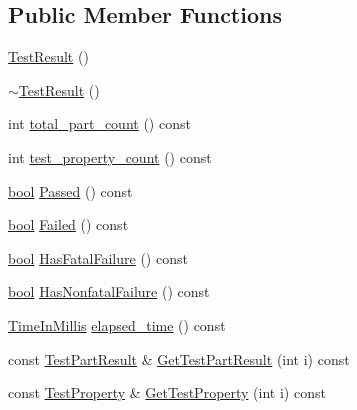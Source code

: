 \subsection*{Public Member Functions}
\begin{DoxyCompactItemize}
\item 
\hyperlink{classtesting_1_1TestResult_a5cf5dd6f416b7334ea601aab21a2fda5}{Test\+Result} ()
\item 
\hyperlink{classtesting_1_1TestResult_a41f407680b725b75d7eadc3230bc3315}{$\sim$\+Test\+Result} ()
\item 
int \hyperlink{classtesting_1_1TestResult_a6174aa4019dcda7c34d776b5741c9032}{total\+\_\+part\+\_\+count} () const
\item 
int \hyperlink{classtesting_1_1TestResult_afe4523257bbea8bc63b0950b702790be}{test\+\_\+property\+\_\+count} () const
\item 
\hyperlink{classbool}{bool} \hyperlink{classtesting_1_1TestResult_acf7e6e72f05a0545c48ea48e7f8851df}{Passed} () const
\item 
\hyperlink{classbool}{bool} \hyperlink{classtesting_1_1TestResult_afacc37e8b43c8574e4101bc61723c769}{Failed} () const
\item 
\hyperlink{classbool}{bool} \hyperlink{classtesting_1_1TestResult_a30e00d4076ae07fb5ad7b623d9dc1fe4}{Has\+Fatal\+Failure} () const
\item 
\hyperlink{classbool}{bool} \hyperlink{classtesting_1_1TestResult_a510564fa67b485ed4589a259f2a032d6}{Has\+Nonfatal\+Failure} () const
\item 
\hyperlink{namespacetesting_a992de1d091ce660f451d1e8b3ce30fd6}{Time\+In\+Millis} \hyperlink{classtesting_1_1TestResult_a717e05e00d4af5cb809433e343ab63af}{elapsed\+\_\+time} () const
\item 
const \hyperlink{classtesting_1_1TestPartResult}{Test\+Part\+Result} \& \hyperlink{classtesting_1_1TestResult_a765c1e734ac08115757b343d57226bba}{Get\+Test\+Part\+Result} (int i) const
\item 
const \hyperlink{classtesting_1_1TestProperty}{Test\+Property} \& \hyperlink{classtesting_1_1TestResult_a6c2f478dbce36b57d18bedded46d70af}{Get\+Test\+Property} (int i) const
\end{DoxyCompactItemize}
